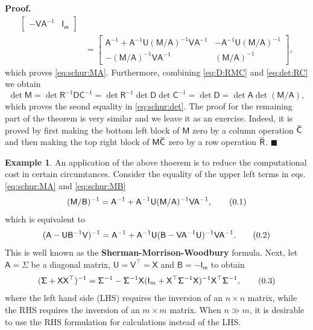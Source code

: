 \documentclass[10pt]{article}
\theoremstyle{definition}
\theoremstyle{definition}
\newtheorem{exmp}{Example}[section]
\theoremstyle{remark}
\newenvironment{prf}{\noindent\textbf{Proof.}}{\hfill$\blacksquare$}
\newcommand\eqnum{\addtocounter{equation}{1}\tag{\arabic{section}.\arabic{equation}}}
\newcommand{\overbar}[1]{\mkern 1.5mu\overline{\mkern-1.5mu#1\mkern-1.5mu}\mkern 1.5mu}
\begin{document}
\begin{prf}
\begin{align*}
\begin{bmatrix}
-\mathsf{V}\mathsf{A}^{-1} & \mathsf{I_m}
\end{bmatrix} \\ &=
\begin{bmatrix}
\mathsf{A}^{-1} + \mathsf{A}^{-1}\mathsf{U}(\mathsf{M}/\mathsf{A})^{-1}\mathsf{V}\mathsf{A}^{-1} & 
-\mathsf{A}^{-1}\mathsf{U}(\mathsf{M}/\mathsf{A})^{-1} \\
-(\mathsf{M}/\mathsf{A})^{-1}\mathsf{V}\mathsf{A}^{-1} & (\mathsf{M}/\mathsf{A})^{-1}
\end{bmatrix},
\end{align*}
which proves \cref{eq:schur:MA}. Furthermore, combining \cref{eq:D:RMC} and \cref{eq:det:RC} we obtain
\begin{equation*}
\det\mathsf{M} = \det\mathsf{R}^{-1}\mathsf{D}\mathsf{C}^{-1} = \det\mathsf{R}^{-1} \det\mathsf{D} \det\mathsf{C}^{-1}
= \det\mathsf{D} = \det\mathsf{A}\det(\mathsf{M}/\mathsf{A}),
\end{equation*}
which proves the seond equality in \cref{eq:schur:det}. The proof for the remaining part of the theorem is very similar and we leave it as an exercise. Indeed, it is proved by first making the bottom left block of $\mathsf{M}$ zero by a column operation $\overbar{\mathsf{C}}$ and then making the top right block of $\mathsf{M}\overbar{\mathsf{C}}$ zero by a row operation $\overbar{\mathsf{R}}$.
\end{prf}
\begin{exmp}
An application of the above thoerem is to reduce the computational cost in certain circumtances. Consider the equality of the upper left terms in eqs. \eqref{eq:schur:MA} and \eqref{eq:schur:MB}
\begin{equation*}
(\mathsf{M}/\mathsf{B})^{-1} = \mathsf{A}^{-1} + \mathsf{A}^{-1}\mathsf{U}(\mathsf{M}/\mathsf{A})^{-1}\mathsf{V}\mathsf{A}^{-1},
\eqnum
\end{equation*}
which is equivalent to
\begin{equation*}
(\mathsf{A} - \mathsf{U}\mathsf{B}^{-1}\mathsf{V})^{-1} = \mathsf{A}^{-1} + \mathsf{A}^{-1}\mathsf{U}(\mathsf{B}-\mathsf{V}\mathsf{A}^{-1}\mathsf{U})^{-1}\mathsf{V}\mathsf{A}^{-1}.
\eqnum
\label{eq:SMW:formula}
\end{equation*}
This is well known as the \textbf{Sherman-Morrison-Woodbury} formula. Next, let $\mathsf{A} = \mathsf{\Sigma}$ be a diagonal matrix, $\mathsf{U} = \mathsf{V}^{\top} = \mathsf{X}$ and $\mathsf{B} = -\mathsf{I_m}$ to obtain
\begin{equation*}
(\mathsf{\Sigma} + \mathsf{X}\mathsf{X}^{\top})^{-1} =
\mathsf{\Sigma}^{-1} - \mathsf{\Sigma}^{-1}\mathsf{X}(\mathsf{I}_m+\mathsf{X}^{\top}\mathsf{\Sigma}^{-1}\mathsf{X})^{-1}\mathsf{X}^{\top}\mathsf{\Sigma}^{-1},
\eqnum
\end{equation*}
where the left hand side (LHS) requires the inversion of an $n\times n$ matrix, while the RHS requires the inversion of an $m\times m$ matrix. When $n \gg m$, it is desirable to use the RHS formulation for calculations instead of the LHS. 
\end{exmp}
\end{document}
